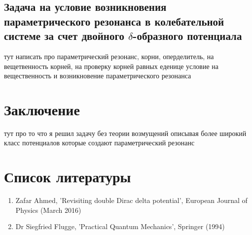 \documentclass[11pt]{article}    %
\begin{document}
\subsection{Задача на условие возникновения параметрического резонанса в колебательной системе за счет двойного $\delta$-образного потенциала}
\par {\color{red} тут написать про параметрический резонанс, корни, оперделитель, на вещетвенность корней, на проверку корней равных еденице условие на вещественность и возникновение параметрического резонанса}

\section{Заключение}
{\color{red} тут про то что я решил задачу без теории возмущений описывая более широкий класс потенциалов которые создают параметрический резонанс}

\section{Список литературы}

   \begin{enumerate}
       \item Zafar Ahmed, 'Revisiting double Dirac delta potential', European Journal of Physics (March 2016)
       \item Dr Siegfried Flugge, 'Practical Quantum Mechanics', Springer (1994)
   \end{enumerate}

%
%
\end{document}
